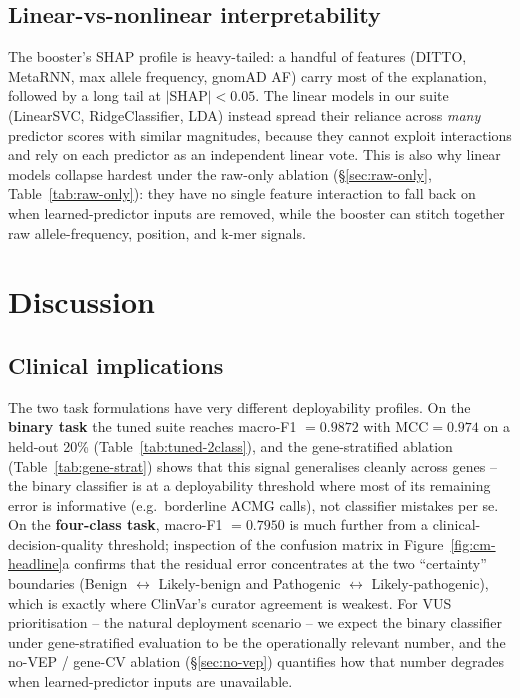 \documentclass[11pt,a4paper]{article}
\begin{document}
\subsection{Linear-vs-nonlinear interpretability}

The booster's SHAP profile is heavy-tailed: a handful of features (DITTO,
MetaRNN, max allele frequency, gnomAD AF) carry most of the explanation,
followed by a long tail at $|$SHAP$|<0.05$. The linear models in our suite
(LinearSVC, RidgeClassifier, LDA) instead spread their reliance across
\emph{many} predictor scores with similar magnitudes, because they cannot
exploit interactions and rely on each predictor as an independent linear
vote. This is also why linear models collapse hardest under the raw-only
ablation (\S\ref{sec:raw-only}, Table~\ref{tab:raw-only}): they have no
single feature interaction to fall back on when learned-predictor inputs
are removed, while the booster can stitch together raw allele-frequency,
position, and k-mer signals.

\section{Discussion}

\subsection{Clinical implications}

The two task formulations have very different deployability profiles. On the
\textbf{binary task} the tuned suite reaches macro-F1 $=0.9872$ with
$\text{MCC}=0.974$ on a held-out 20\% (Table~\ref{tab:tuned-2class}), and the
gene-stratified ablation (Table~\ref{tab:gene-strat}) shows that this signal
generalises cleanly across genes -- the binary classifier is at a deployability
threshold where most of its remaining error is informative (e.g.\ borderline
ACMG calls), not classifier mistakes per se. On the \textbf{four-class task},
macro-F1 $=0.7950$ is much further from a clinical-decision-quality threshold;
inspection of the confusion matrix in Figure~\ref{fig:cm-headline}a confirms
that the residual error concentrates at the two ``certainty'' boundaries
(Benign $\leftrightarrow$ Likely-benign and Pathogenic $\leftrightarrow$
Likely-pathogenic), which is exactly where ClinVar's curator agreement is
weakest. For VUS prioritisation -- the natural deployment scenario -- we expect
the binary classifier under gene-stratified evaluation to be the operationally
relevant number, and the no-VEP / gene-CV ablation
(\S\ref{sec:no-vep}) quantifies how that number degrades when learned-predictor
inputs are unavailable.
\end{document}

